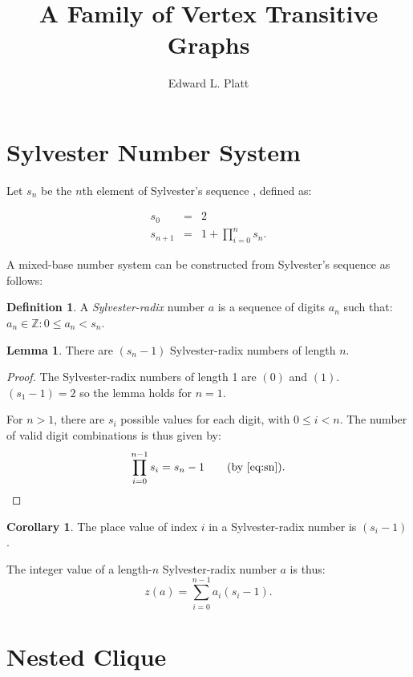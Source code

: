 \documentclass{article}
\title{A Family of Vertex Transitive Graphs}
\author{Edward L. Platt}
\theoremstyle{definition}
\newtheorem{definition}{Definition}[section]
\newtheorem{lemma}{Lemma}
\newtheorem{corollary}{Corollary}
\begin{document}
\maketitle

\section{Sylvester Number System}

Let $s_n$ be the $n$th element of Sylvester's sequence \cite{sylvester1880point}, defined as:

\begin{eqnarray}
s_0 &=& 2 \\
s_{n + 1} &=& 1 + \prod_{i=0}^n s_n. \label{eq:sn}
\end{eqnarray}

A mixed-base number system can be constructed from Sylvester's sequence as follows:
\begin{definition}
A {\em Sylvester-radix} number $a$ is a sequence of digits $a_n$ such that: $a_n \in \mathbb{Z} : 0 \le a_n < s_n$.
\end{definition}

\begin{lemma}
There are $(s_n - 1)$ Sylvester-radix numbers of length $n$.
\end{lemma}

\begin{proof}
The Sylvester-radix numbers of length 1 are $(0)$ and $(1)$. $(s_1 - 1) = 2$ so the lemma holds for $n=1$.

For $n > 1$, there are $s_i$ possible values for each digit, with $0 \le i < n$. The number of valid digit combinations is thus given by:
\begin{equation*}
\prod_{i=0}^{n-1} s_i = s_n - 1 \qquad \text{(by \eqref{eq:sn})}.
\end{equation*}
\end{proof}

\begin{corollary}
The place value of index $i$ in a Sylvester-radix number is $(s_i - 1)$.
\end{corollary}

The integer value of a length-$n$ Sylvester-radix number $a$ is thus:
\begin{equation}
z(a) = \sum_{i=0}^{n-1} a_i (s_i - 1).
\end{equation}

\section{Nested Clique}
\end{document}
